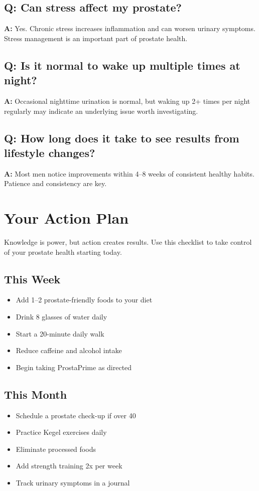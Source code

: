 \documentclass[11pt,oneside,openany]{book}
\begin{document}
\section*{Q: Can stress affect my prostate?}
\textbf{A:} Yes. Chronic stress increases inflammation and can worsen urinary symptoms. Stress management is an important part of prostate health.

\section*{Q: Is it normal to wake up multiple times at night?}
\textbf{A:} Occasional nighttime urination is normal, but waking up 2+ times per night regularly may indicate an underlying issue worth investigating.

\section*{Q: How long does it take to see results from lifestyle changes?}
\textbf{A:} Most men notice improvements within 4--8 weeks of consistent healthy habits. Patience and consistency are key.

\clearpage

\chapter*{Your Action Plan}

Knowledge is power, but action creates results. Use this checklist to take control of your prostate health starting today.

\section*{This Week}
\begin{itemize}[leftmargin=*]
\item[$\square$] Add 1--2 prostate-friendly foods to your diet
\item[$\square$] Drink 8 glasses of water daily
\item[$\square$] Start a 20-minute daily walk
\item[$\square$] Reduce caffeine and alcohol intake
\item[$\square$] Begin taking ProstaPrime as directed
\end{itemize}

\section*{This Month}
\begin{itemize}[leftmargin=*]
\item[$\square$] Schedule a prostate check-up if over 40
\item[$\square$] Practice Kegel exercises daily
\item[$\square$] Eliminate processed foods
\item[$\square$] Add strength training 2x per week
\item[$\square$] Track urinary symptoms in a journal
\end{itemize}
\end{document}
